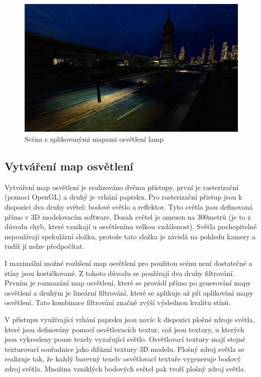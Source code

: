 \documentclass[11pt,twoside,a4paper]{book}
\begin{document}
\begin{figure}[h!]
\begin{center}
\includegraphics[width=120mm]{figures/lamps.png}
\caption{Scéna s aplikovanými mapami osvětlení lamp}
\end{center}
\end{figure}

\subsection{Vytváření map osvětlení}
Vytváření map osvětlení je realizováno dvěma přístupy, první je rasterizační (pomocí OpenGL) a druhý je vrhání paprsku. Pro rasterizační přistup jsou k dispozici dva druhy světel: bodové světlo a reflektor. Tyto světla jsou definovaná přímo v 3D modelovacím software. Dosah světel je omezen na 300metrů (je to z důvodu chyb, které vznikají u osvětlení\linebreak na velkou vzdálenost). Světla pochopitelně nepoužívají spekulární složku, protože tato složka je závislá na pohledu kamery a tudíž jí nelze předpočítat.

I maximální možné rozlišení map osvětlení pro použitou scénu není dostatečné a stíny jsou kostičkované. Z tohoto důvodu se používají dva druhy filtrování. Prvním je rozmazání map osvětlení, které se provádí přímo po generování mapy osvětlení a druhým je lineární filtrování, které se aplikuje až při aplikování mapy osvětlení. Tato kombinace filtrování značně zvýší výslednou kvalitu stínů.

V přístupu využívající vrhání paprsku jsou navíc k dispozici plošné zdroje světla, které jsou definovány pomocí osvětlovacích textur, což jsou textury, u kterých jsou vykresleny pouze texely vyzařující světlo. Osvětlovací textury mají stejné texturovací souřadnice jako difúzní textury 3D modelu. Plošný zdroj světla se realizuje tak, že každý barevný texel\linebreak v osvětlovací textuře vygeneruje bodový zdroj světla. Množina vzniklých bodových světel pak tvoří plošný zdroj světla.
\end{document}

